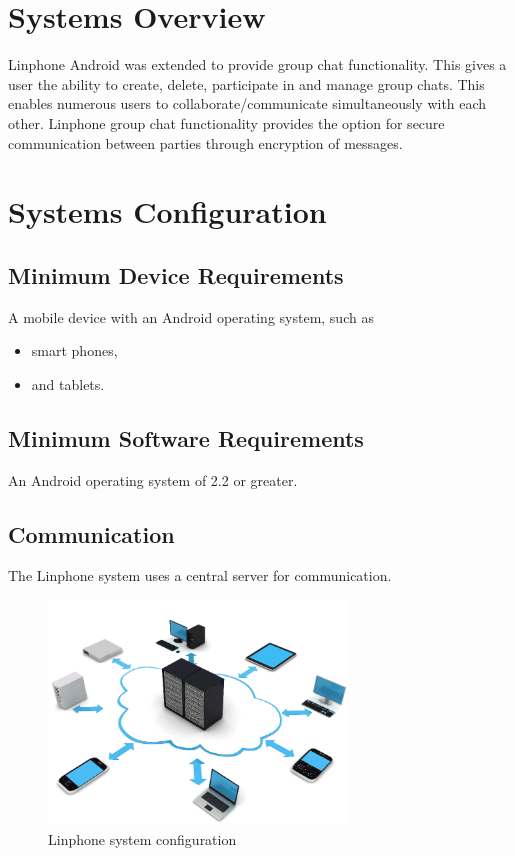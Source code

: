 \documentclass[11pt]{article}
\begin{document}


\setcounter{tocdepth}{3}
\setcounter{secnumdepth}{5}
\tableofcontents

\newpage
\section{Systems Overview} 
Linphone Android was extended to provide group chat functionality. This gives a user the ability to create, delete, participate in and manage group chats. This enables numerous users to collaborate/communicate simultaneously with each other. Linphone group chat functionality provides the option for secure communication between parties through encryption of messages.

\section{Systems Configuration}
\subsection{Minimum Device Requirements}
A mobile device with an Android operating system, such as
\begin{itemize}
\item smart phones,
\item and tablets.
\end{itemize}
\subsection{Minimum Software Requirements}
An Android operating system of 2.2 or greater.

\subsection{Communication}

The Linphone system uses a central server for communication.

\begin{figure}[H]
\includegraphics[width=300px]{./images/network.png}
\caption{Linphone system configuration}
\label{Configuration}
\end{figure}
\end{document}
